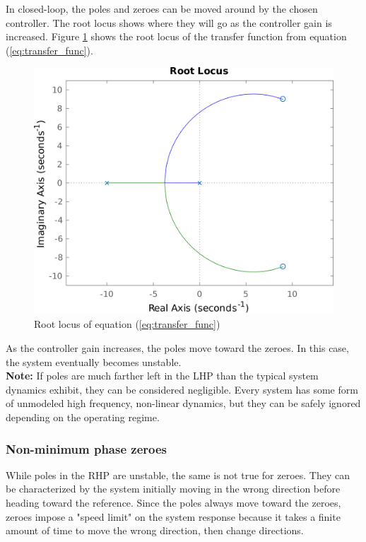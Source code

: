 \documentclass[10pt,conference,compsoc]{IEEEtran}
\begin{document}
\noindent In closed-loop, the poles and zeroes can be moved around by the chosen
controller. The root locus shows where they will go as the controller gain is
increased. Figure \ref{fig:poster_rlocus} shows the root locus of the transfer
function from equation (\ref{eq:transfer_func}).

\begin{figure}[H]
  \includegraphics[width=\linewidth]{figs/poster_rlocus.png}
  \caption{Root locus of equation (\ref{eq:transfer_func})}
  \label{fig:poster_rlocus}
\end{figure}

\noindent As the controller gain increases, the poles move toward the zeroes. In
this case, the system eventually becomes unstable. \\

\noindent \textbf{Note:} If poles are much farther left in the LHP than the
typical system dynamics exhibit, they can be considered negligible. Every system
has some form of unmodeled high frequency, non-linear dynamics, but they can be
safely ignored depending on the operating regime.

\subsubsection{Non-minimum phase zeroes}

While poles in the RHP are unstable, the same is not true for zeroes. They can
be characterized by the system initially moving in the wrong direction before
heading toward the reference. Since the poles always move toward the zeroes,
zeroes impose a "speed limit" on the system response because it takes a finite
amount of time to move the wrong direction, then change directions. \\
\end{document}
